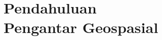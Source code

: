 \documentclass{WileySix}
\begin{document}












\part[Pendahuluan]
{Pendahuluan\\ Pengantar Geospasial}


%
\end{document}
